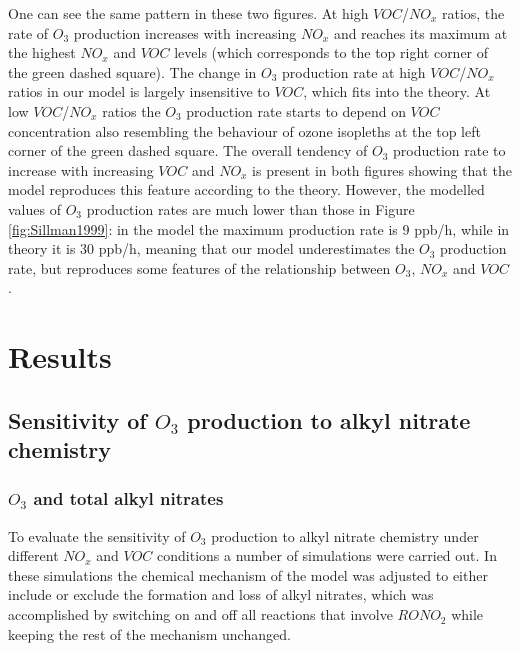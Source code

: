 \documentclass[11pt,a4paper]{article}
\begin{document}
One can see the same pattern in these two figures. At high $VOC$/$NO_x$ ratios, the rate of $O_3$ production increases with increasing $NO_x$ and reaches its maximum at the highest $NO_x$ and $VOC$ levels (which corresponds to the top right corner of the green dashed square). The change in $O_3$ production rate at high $VOC$/$NO_x$ ratios in our model is largely insensitive to $VOC$, which fits into the theory. At low $VOC$/$NO_x$ ratios the $O_3$ production rate starts to depend on $VOC$ concentration also resembling the behaviour of ozone isopleths at the top left corner of the green dashed square. The overall tendency of $O_3$ production rate to increase with increasing $VOC$ and $NO_x$ is present in both figures showing that the model reproduces this feature according to the theory. However, the modelled values of $O_3$ production rates are much lower than those in Figure \ref{fig:Sillman1999}: in the model the maximum production rate is 9 ppb/h, while in theory it is 30 ppb/h, meaning that our model underestimates the $O_3$ production rate, but reproduces some features of the relationship between $O_3$, $NO_x$ and $VOC$.

\section{Results} \label{sec:res}
\subsection{Sensitivity of $O_3$ production to alkyl nitrate chemistry}\label{sec:res_O3ANsensetivity}
\subsubsection{$O_3$ and total alkyl nitrates}

To evaluate the sensitivity of $O_3$ production to alkyl nitrate chemistry under different $NO_x$ and $VOC$ conditions a number of simulations were carried out. In these simulations the chemical mechanism of the model was adjusted to either include or exclude the formation and loss of alkyl nitrates, which was accomplished by switching on and off all reactions that involve $RONO_2$ while keeping the rest of the mechanism unchanged. 
\end{document}
